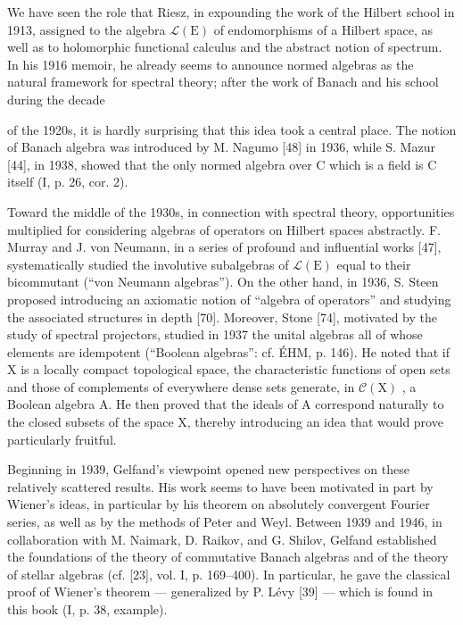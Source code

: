 
We have seen the role that Riesz, in expounding the work of the Hilbert school in 1913, assigned to the algebra \(\mathcal{L}(\mathrm{E})\) of endomorphisms of a Hilbert space, as well as to holomorphic functional calculus and the abstract notion of spectrum. In his 1916 memoir, he already seems to announce normed algebras as the natural framework for spectral theory; after the work of Banach and his school during the decade

of the 1920s, it is hardly surprising that this idea took a central place. The notion of Banach algebra was introduced by M. Nagumo {[}48{]} in 1936, while S. Mazur {[}44{]}, in 1938, showed that the only normed algebra over C which is a field is C itself (I, p. 26, cor. 2).

Toward the middle of the 1930s, in connection with spectral theory, opportunities multiplied for considering algebras of operators on Hilbert spaces abstractly. F. Murray and J. von Neumann, in a series of profound and influential works {[}47{]}, systematically studied the involutive subalgebras of \(\mathcal{L}(\mathrm{E})\) equal to their bicommutant (“von Neumann algebras”). On the other hand, in 1936, S. Steen proposed introducing an axiomatic notion of “algebra of operators” and studying the associated structures in depth {[}70{]}. Moreover, Stone {[}74{]}, motivated by the study of spectral projectors, studied in 1937 the unital algebras all of whose elements are idempotent (“Boolean algebras”: cf. ÉHM, p. 146). He noted that if X is a locally compact topological space, the characteristic functions of open sets and those of complements of everywhere dense sets generate, in \(\mathcal{C}(\mathrm{X})\) , a Boolean algebra A. He then proved that the ideals of A correspond naturally to the closed subsets of the space X, thereby introducing an idea that would prove particularly fruitful.

Beginning in 1939, Gelfand's viewpoint opened new perspectives on these relatively scattered results. His work seems to have been motivated in part by Wiener's ideas, in particular by his theorem on absolutely convergent Fourier series, as well as by the methods of Peter and Weyl. Between 1939 and 1946, in collaboration with M. Naimark, D. Raikov, and G. Shilov, Gelfand established the foundations of the theory of commutative Banach algebras and of the theory of stellar algebras (cf. {[}23{]}, vol. I, p. 169--400). In particular, he gave the classical proof of Wiener's theorem --- generalized by P. Lévy {[}39{]} --- which is found in this book (I, p. 38, example).

